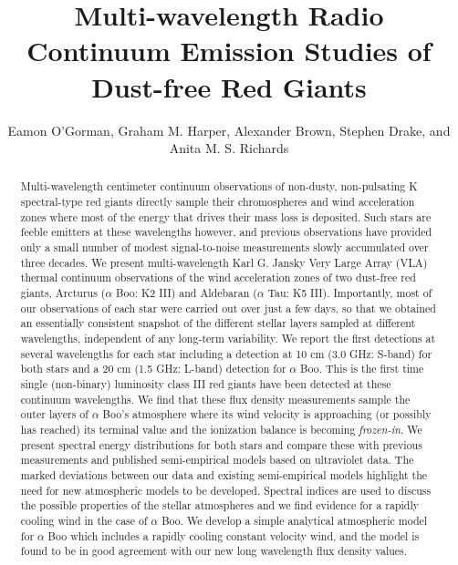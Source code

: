 \documentclass[iop]{emulateapj}
\begin{document}
\title{Multi-wavelength Radio Continuum Emission Studies of Dust-free Red Giants}


\author{Eamon O'Gorman, Graham M. Harper, Alexander Brown, Stephen Drake, and Anita M. S. Richards}



\begin{abstract}

Multi-wavelength centimeter continuum observations of non-dusty, non-pulsating K spectral-type red giants directly sample their chromospheres and wind acceleration zones where most of the energy that drives their mass loss is deposited. Such stars are feeble emitters at these wavelengths however, and previous observations have provided only a small number of modest signal-to-noise measurements slowly accumulated over three decades. We present multi-wavelength Karl G. Jansky Very Large Array (VLA) thermal continuum observations of the wind acceleration zones of two dust-free red giants, Arcturus ($\alpha$ Boo: K2 III) and Aldebaran ($\alpha$ Tau: K5 III). Importantly, most of our observations of each star were carried out over just a few days, so that we obtained an essentially consistent snapshot of the different stellar layers sampled at different wavelengths, independent of any long-term variability. We report the first detections at several wavelengths for each star including a detection at 10 cm (3.0 GHz: S-band) for both stars and a 20 cm (1.5 GHz: L-band) detection for $\alpha$ Boo. This is the first time single (non-binary) luminosity class III red giants have been detected at these continuum wavelengths. We find that these flux density measurements sample the outer layers of $\alpha$ Boo's atmosphere where its wind velocity is approaching (or possibly has reached) its terminal value and the ionization balance is becoming \textit{frozen-in}. We present spectral energy distributions for both stars and compare these with previous measurements and published semi-empirical models based on ultraviolet data. The marked deviations between our data and existing semi-empirical models highlight the need for new atmospheric models to be developed. Spectral indices are used to discuss the possible properties of the stellar atmospheres and we find evidence for a rapidly cooling wind in the case of $\alpha$ Boo. We develop a simple analytical atmospheric model for $\alpha$ Boo which includes a rapidly cooling constant velocity wind, and the model is found to be in good agreement with our new long wavelength flux density values.

\end{abstract}
\end{document}
